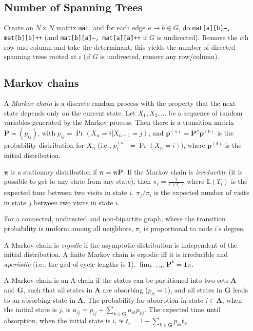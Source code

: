 	\subsection{Number of Spanning Trees}
		Create an $N\times N$ matrix \texttt{mat}, and for each edge $a \rightarrow b \in G$, do
		\texttt{mat[a][b]--, mat[b][b]++} (and \texttt{mat[b][a]--, mat[a][a]++} if $G$ is undirected).
		Remove the $i$th row and column and take the determinant; this yields the number of directed spanning trees rooted at $i$
		(if $G$ is undirected, remove any row/column).

	\subsection{Markov chains}
		A \emph{Markov chain} is a discrete random process with the property that the next state depends only on the current state.
		Let $X_1,X_2,\ldots$ be a sequence of random variables generated by the Markov process.
		Then there is a transition matrix $\mathbf{P} = (p_{ij})$, with $p_{ij} = \Pr(X_n = i | X_{n-1} = j)$,
		and $\mathbf{p}^{(n)} = \mathbf P^n \mathbf p^{(0)}$ is the probability distribution for $X_n$ (i.e., $p^{(n)}_i = \Pr(X_n = i)$),
		where $\mathbf{p}^{(0)}$ is the initial distribution.

		$\mathbf{\pi}$ is a stationary distribution if $\mathbf{\pi} = \mathbf{\pi P}$.
		If the Markov chain is \emph{irreducible} (it is possible to get to any state from any state),
		then $\pi_i = \frac{1}{\mathbb{E}(T_i)}$ where $\mathbb{E}(T_i)$  is the expected time between two visits in state $i$.
		$\pi_j/\pi_i$ is the expected number of visits in state $j$ between two visits in state $i$.

		For a connected, undirected and non-bipartite graph, where the transition probability is uniform among all neighbors, $\pi_i$ is proportional to node $i$'s degree.

		A Markov chain is \emph{ergodic} if the asymptotic distribution is independent of the initial distribution.
		A finite Markov chain is ergodic iff it is irreducible and \emph{aperiodic} (i.e., the gcd of cycle lengths is 1).
		$\lim_{k\rightarrow\infty}\mathbf{P}^k = \mathbf{1}\pi$.

		A Markov chain is an A-chain if the states can be partitioned into two sets $\mathbf{A}$ and $\mathbf{G}$, such that all states in $\mathbf{A}$ are absorbing ($p_{ii}=1$), and all states in $\mathbf{G}$ leads to an absorbing state in $\mathbf{A}$.
		The probability for absorption in state $i\in\mathbf{A}$, when the initial state is $j$, is $a_{ij} = p_{ij}+\sum_{k\in\mathbf{G}} a_{ik}p_{kj}$.
		The expected time until absorption, when the initial state is $i$, is $t_i = 1+\sum_{k\in\mathbf{G}}p_{ki}t_k$.
